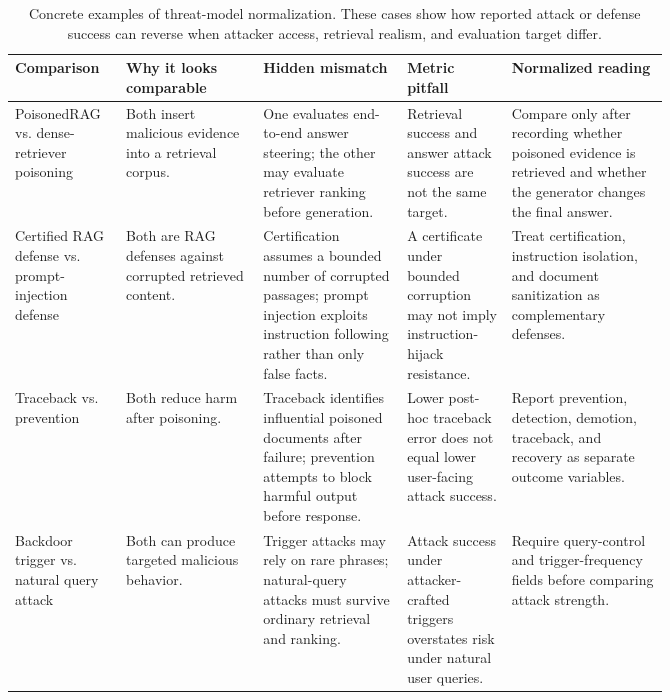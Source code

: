 \begin{table}[t]
\centering
\scriptsize
\renewcommand{\arraystretch}{0.88}
\begin{tabularx}{\linewidth}{>{\raggedright\arraybackslash}p{0.17\linewidth}>{\raggedright\arraybackslash}p{0.21\linewidth}>{\raggedright\arraybackslash}p{0.22\linewidth}>{\raggedright\arraybackslash}p{0.16\linewidth}X}
\toprule
\textbf{Comparison} & \textbf{Why it looks comparable} & \textbf{Hidden mismatch} & \textbf{Metric pitfall} & \textbf{Normalized reading} \\
\midrule
PoisonedRAG vs. dense-retriever poisoning & Both insert malicious evidence into a retrieval corpus. & One evaluates end-to-end answer steering; the other may evaluate retriever ranking before generation. & Retrieval success and answer attack success are not the same target. & Compare only after recording whether poisoned evidence is retrieved and whether the generator changes the final answer. \\
Certified RAG defense vs. prompt-injection defense & Both are RAG defenses against corrupted retrieved content. & Certification assumes a bounded number of corrupted passages; prompt injection exploits instruction following rather than only false facts. & A certificate under bounded corruption may not imply instruction-hijack resistance. & Treat certification, instruction isolation, and document sanitization as complementary defenses. \\
Traceback vs. prevention & Both reduce harm after poisoning. & Traceback identifies influential poisoned documents after failure; prevention attempts to block harmful output before response. & Lower post-hoc traceback error does not equal lower user-facing attack success. & Report prevention, detection, demotion, traceback, and recovery as separate outcome variables. \\
Backdoor trigger vs. natural query attack & Both can produce targeted malicious behavior. & Trigger attacks may rely on rare phrases; natural-query attacks must survive ordinary retrieval and ranking. & Attack success under attacker-crafted triggers overstates risk under natural user queries. & Require query-control and trigger-frequency fields before comparing attack strength. \\
\bottomrule
\end{tabularx}
\caption{Concrete examples of threat-model normalization. These cases show how reported attack or defense success can reverse when attacker access, retrieval realism, and evaluation target differ.}
\label{tab:threat-model-examples}
\end{table}

